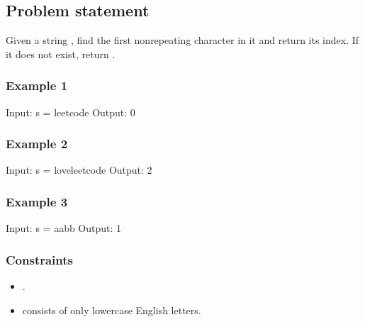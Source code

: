 \documentclass[letterpaper,12pt,english]{book}
\begin{document}
\subsection{Problem statement\sphinxfootnotemark[102]}
\label{\detokenize{Counting/387_First_Unique_Character_in_a_String:problem-statement}}%
\begin{footnotetext}[102]\sphinxAtStartFootnote
{}
%
\end{footnotetext}\ignorespaces 
\sphinxAtStartPar
Given a string , find the first non\sphinxhyphen{}repeating character in it and return its index. If it does not exist, return .


\subsubsection{Example 1}
\label{\detokenize{Counting/387_First_Unique_Character_in_a_String:example-1}}
\begin{sphinxVerbatim}[commandchars=\\\{\}]
Input: s = \PYGZdq{}leetcode\PYGZdq{}
Output: 0
\end{sphinxVerbatim}


\subsubsection{Example 2}
\label{\detokenize{Counting/387_First_Unique_Character_in_a_String:example-2}}
\begin{sphinxVerbatim}[commandchars=\\\{\}]
Input: s = \PYGZdq{}loveleetcode\PYGZdq{}
Output: 2
\end{sphinxVerbatim}


\subsubsection{Example 3}
\label{\detokenize{Counting/387_First_Unique_Character_in_a_String:example-3}}
\begin{sphinxVerbatim}[commandchars=\\\{\}]
Input: s = \PYGZdq{}aabb\PYGZdq{}
Output: \PYGZhy{}1
\end{sphinxVerbatim}


\subsubsection{Constraints}
\label{\detokenize{Counting/387_First_Unique_Character_in_a_String:constraints}}\begin{itemize}
\item {} 
\sphinxAtStartPar
{}.

\item {} 
\sphinxAtStartPar
{} consists of only lowercase English letters.

\end{itemize}
\end{document}
